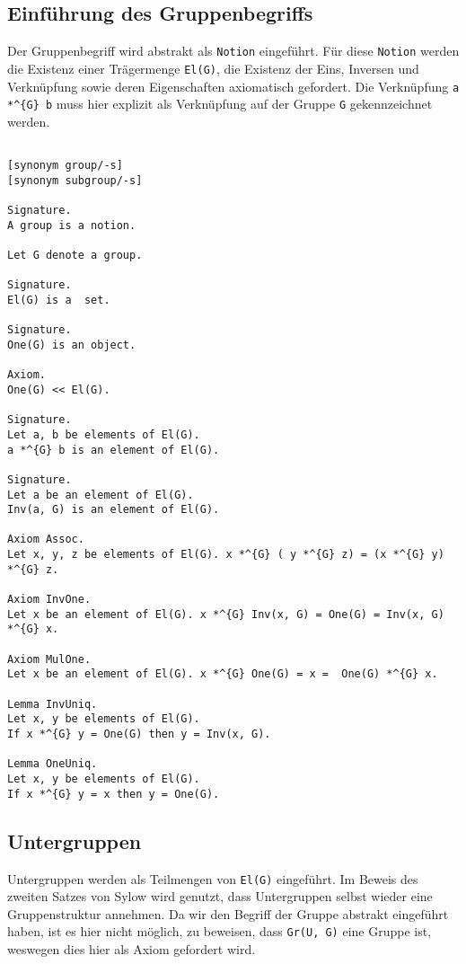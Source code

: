 \documentclass[a4paper,12pt]{scrartcl}
\begin{document}
\subsection{Einführung des Gruppenbegriffs}

Der Gruppenbegriff wird abstrakt als \verb!Notion! eingeführt.
Für diese \verb!Notion! werden die Existenz einer Trägermenge \verb!El(G)!, die Existenz der Eins, Inversen und Verknüpfung sowie deren Eigenschaften axiomatisch gefordert.
Die Verknüpfung \verb!a *^{G} b! muss hier explizit als Verknüpfung auf der Gruppe \verb!G! gekennzeichnet werden.

\begin{lstlisting}

[synonym group/-s]
[synonym subgroup/-s]

Signature.
A group is a notion.

Let G denote a group.

Signature.
El(G) is a  set.

Signature.
One(G) is an object.

Axiom.
One(G) << El(G).

Signature.
Let a, b be elements of El(G).
a *^{G} b is an element of El(G).

Signature.
Let a be an element of El(G).
Inv(a, G) is an element of El(G).

Axiom Assoc.
Let x, y, z be elements of El(G). x *^{G} ( y *^{G} z) = (x *^{G} y) *^{G} z. 

Axiom InvOne.
Let x be an element of El(G). x *^{G} Inv(x, G) = One(G) = Inv(x, G) *^{G} x.

Axiom MulOne.
Let x be an element of El(G). x *^{G} One(G) = x =  One(G) *^{G} x.

Lemma InvUniq.
Let x, y be elements of El(G).
If x *^{G} y = One(G) then y = Inv(x, G).

Lemma OneUniq.
Let x, y be elements of El(G).
If x *^{G} y = x then y = One(G).

\end{lstlisting}

\subsection{Untergruppen}

Untergruppen werden als Teilmengen von \verb!El(G)! eingeführt.
Im Beweis des zweiten Satzes von Sylow wird genutzt, dass Untergruppen selbst wieder eine Gruppenstruktur annehmen. Da wir den Begriff der Gruppe abstrakt eingeführt haben, ist es hier nicht möglich, zu beweisen, dass \verb!Gr(U, G)! eine Gruppe ist, weswegen dies hier als Axiom gefordert wird.
\end{document}
